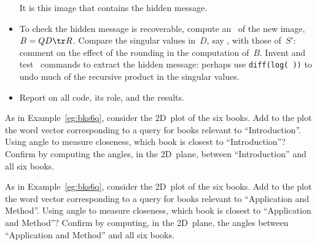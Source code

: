 \begin{exercise}
\begin{itemize}
It is this image that contains the hidden message.

\item To check the hidden message is recoverable, compute an \svd\ of the new image, \(B=QD\tr R\).
Compare the singular values in~\(D\), say \hlist{}, with those of~\(S'\): comment on the effect of the rounding in the computation of~\(B\).
Invent and test \script\ commands to extract the hidden message: perhaps use \verb|diff(log( ))| to undo much of the recursive product in the singular values.

\item Report on all code, its role, and the results.

\end{itemize}
\end{exercise}





\begin{comment}
Exercises on colour images, perhaps rounding 0-1 images such as fingerprints, also on PCA, LSI, and possibly SSA.
\end{comment}




\begin{exercise} \label{ex:} 
As in Example~\ref{eg:bks6q}, consider the 2D~plot of the six books. Add to the plot the word vector corresponding to a query for books relevant to ``Introduction''.
Using angle to measure closeness, which book is closest to ``Introduction''?  
Confirm by computing the angles, in the 2D~plane, between ``Introduction'' and all six books.
\end{exercise}



\begin{exercise} \label{ex:} 
As in Example~\ref{eg:bks6q}, consider the 2D~plot of the six books. Add to the plot the word vector corresponding to a query for books relevant to ``Application and Method''.
Using angle to measure closeness, which book is closest to ``Application and Method''?  
Confirm by computing, in the 2D~plane, the angles between ``Application and Method'' and all six books.
\end{exercise}




